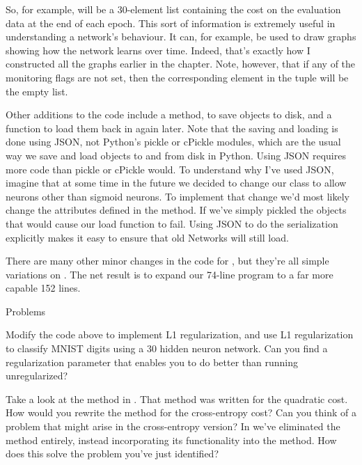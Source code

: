 \documentclass[a4paper,twoside,10pt]{book}
\begin{document}
So, for example,  will be a 30-element list containing the cost on the evaluation data at the end of each epoch. This sort of information is extremely useful in understanding a network's behaviour. It can, for example, be used to draw graphs showing how the network learns over time. Indeed, that's exactly how I constructed all the graphs earlier in the chapter. Note, however, that if any of the monitoring flags are not set, then the corresponding element in the tuple will be the empty list.

Other additions to the code include a  method, to save  objects to disk, and a function to load them back in again later. Note that the saving and loading is done using JSON, not Python's pickle or cPickle modules, which are the usual way we save and load objects to and from disk in Python. Using JSON requires more code than pickle or cPickle would. To understand why I've used JSON, imagine that at some time in the future we decided to change our  class to allow neurons other than sigmoid neurons. To implement that change we'd most likely change the attributes defined in the  method. If we've simply pickled the objects that would cause our load function to fail. Using JSON to do the serialization explicitly makes it easy to ensure that old Networks will still load.

There are many other minor changes in the code for , but they're all simple variations on . The net result is to expand our 74-line program to a far more capable 152 lines.


\begin{exercize}{Problems}
\item Modify the code above to implement L1 regularization, and use L1 regularization to classify MNIST digits using a 30 hidden neuron network. Can you find a regularization parameter that enables you to do better than running unregularized?
\item Take a look at the  method in . That method was written for the quadratic cost. How would you rewrite the method for the cross-entropy cost? Can you think of a problem that might arise in the cross-entropy version? In  we've eliminated the  method entirely, instead incorporating its functionality into the  method. How does this solve the problem you've just identified?
\end{exercize}
\end{document}
